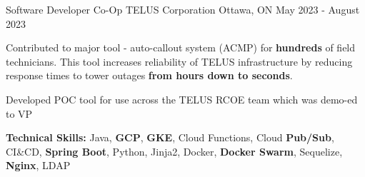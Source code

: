 \begin{cventries}
	\cventry
	{Software Developer Co-Op} %
	{TELUS Corporation} %
	{Ottawa, ON} %
	{May 2023 - August 2023} %
	{
		\begin{cvitems} %
			\item {Contributed to major tool - auto-callout system (ACMP) for \textbf{hundreds} of field technicians. This tool increases reliability of TELUS infrastructure by reducing response times to tower outages \textbf{from hours down to seconds}.}
			\item {Developed POC tool for use across the TELUS RCOE team which was demo-ed to VP}
			\item[] {\textbf{Technical Skills:} Java, \textbf{GCP}, \textbf{GKE}, Cloud Functions, Cloud \textbf{Pub/Sub}, CI\&CD, \textbf{Spring Boot}, Python, Jinja2, Docker, \textbf{Docker Swarm}, Sequelize, \textbf{Nginx}, LDAP}
		\end{cvitems}
	}

\end{cventries}
